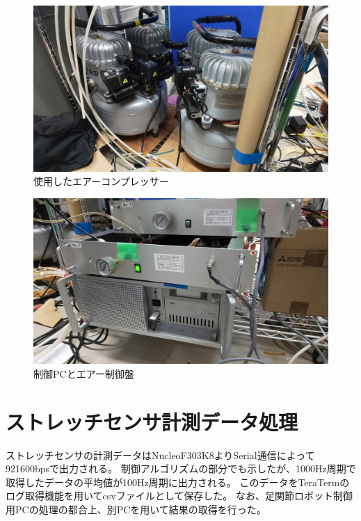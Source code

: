 \begin{figure}[h]
    \begin{center}
     \includegraphics[width=0.65\columnwidth,clip]{./3_analysis/compressor.eps}
     \caption{使用したエアーコンプレッサー}
     \label{fig:compressor}
    \end{center}
\end{figure}

\begin{figure}[h]
    \begin{center}
     \includegraphics[width=0.65\columnwidth,clip]{./3_analysis/PC.eps}
     \caption{制御PCとエアー制御盤}
     \label{fig:PC}
    \end{center}
\end{figure}

\section{ストレッチセンサ計測データ処理}
ストレッチセンサの計測データはNucleoF303K8よりSerial通信によって921600bpsで出力される。
制御アルゴリズムの部分でも示したが、1000Hz周期で取得したデータの平均値が100Hz周期に出力される。
このデータをTeraTermのログ取得機能を用いてcsvファイルとして保存した。
なお、足関節ロボット制御用PCの処理の都合上、別PCを用いて結果の取得を行った。

